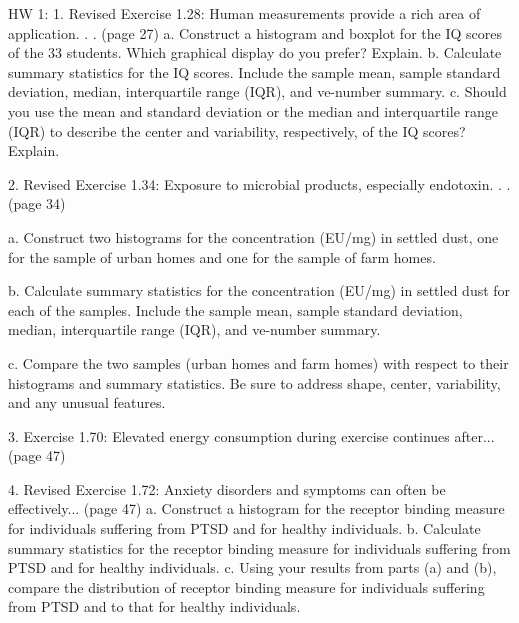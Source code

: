 \documentclass[12pt]{article}
\author{Rose Xu}
\date{\today}
\begin{document}
\maketitle

HW 1:
1. Revised Exercise 1.28: Human measurements provide a rich area of application. . . (page 27)
a. Construct a histogram and boxplot for the IQ scores of the 33 students. Which graphical
display do you prefer? Explain.
b. Calculate summary statistics for the IQ scores. Include the sample mean, sample standard
deviation, median, interquartile range (IQR), and ve-number summary.
c. Should you use the mean and standard deviation or the median and interquartile range (IQR) to
describe the center and variability, respectively, of the IQ scores? Explain.

2. Revised Exercise 1.34: Exposure to microbial products, especially endotoxin. . . (page 34)

a. Construct two histograms for the concentration (EU/mg) in settled dust, one for the sample of
urban homes and one for the sample of farm homes.

b. Calculate summary statistics for the concentration (EU/mg) in settled dust for each of the
samples. Include the sample mean, sample standard deviation, median, interquartile range
(IQR), and ve-number summary.

c. Compare the two samples (urban homes and farm homes) with respect to their histograms and
summary statistics. Be sure to address shape, center, variability, and any unusual features.

3. Exercise 1.70: Elevated energy consumption during exercise continues after... (page 47)

4. Revised Exercise 1.72: Anxiety disorders and symptoms can often be effectively... (page 47)
a. Construct a histogram for the receptor binding measure for individuals suffering from PTSD
and for healthy individuals.
b. Calculate summary statistics for the receptor binding measure for individuals suffering from
PTSD and for healthy individuals.
c. Using your results from parts (a) and (b), compare the distribution of receptor binding measure
for individuals suffering from PTSD and to that for healthy individuals.
\end{document}

